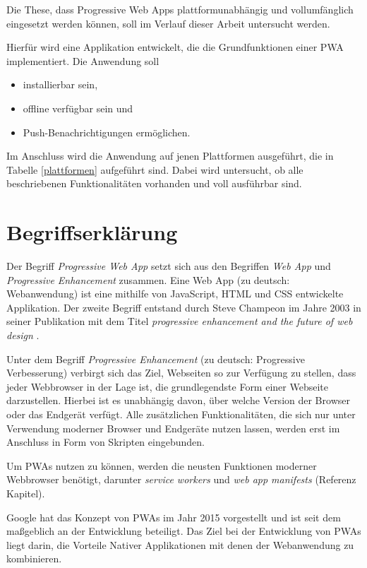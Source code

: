 Die These, dass Progressive Web Apps plattformunabhängig und vollumfänglich eingesetzt werden können, soll im Verlauf dieser Arbeit untersucht werden. 

Hierfür wird eine Applikation entwickelt, die die Grundfunktionen einer PWA implementiert. Die Anwendung soll 
 \begin{itemize}
     \item installierbar sein,
     \item offline verfügbar sein und
     \item Push-Benachrichtigungen ermöglichen. 
 \end{itemize}

Im Anschluss wird die Anwendung auf jenen Plattformen ausgeführt, die in Tabelle \ref{plattformen} aufgeführt sind. Dabei wird untersucht, ob alle beschriebenen Funktionalitäten vorhanden und voll ausführbar sind. 

\section{Begriffserklärung}\label{se:Begriffserklaerung}

Der Begriff \textit{Progressive Web App} setzt sich aus den Begriffen \textit{Web App} und \textit{Progressive Enhancement} zusammen. Eine Web App (zu deutsch: Webanwendung) ist eine mithilfe von JavaScript, HTML und CSS entwickelte Applikation. Der zweite Begriff entstand durch Steve Champeon im Jahre 2003 in seiner Publikation mit dem Titel \textit{progressive enhancement and the future of web design} \cite{Champeon}.

Unter dem Begriff \textit{Progressive Enhancement} (zu deutsch: Progressive Verbesserung) verbirgt sich das Ziel, Webseiten so zur Verfügung zu stellen, dass jeder Webbrowser in der Lage ist, die grundlegendste Form einer Webseite darzustellen. Hierbei ist es unabhängig davon, über welche Version der Browser oder das Endgerät verfügt. 
Alle zusätzlichen Funktionalitäten, die sich nur unter Verwendung moderner Browser und Endgeräte nutzen lassen, werden erst im Anschluss in Form von Skripten eingebunden. 

Um PWAs nutzen zu können, werden die neusten Funktionen moderner Webbrowser benötigt, darunter \textit{service workers} und \textit{web app manifests} (Referenz Kapitel). 

Google hat das Konzept von PWAs im Jahr 2015 vorgestellt und ist seit dem maßgeblich an der Entwicklung beteiligt. 
Das Ziel bei der Entwicklung von PWAs liegt darin, die Vorteile Nativer Applikationen mit denen der Webanwendung zu kombinieren. 


